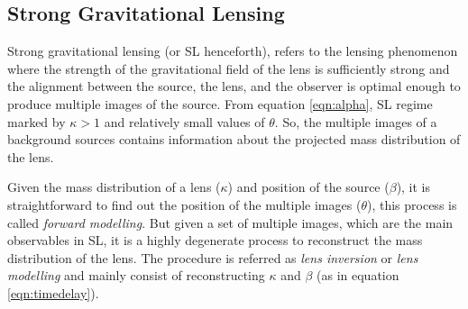 \subsection{Strong Gravitational Lensing}\label{sec:sl}

Strong gravitational lensing (or SL henceforth), refers to the lensing phenomenon
where the strength of the gravitational field of the lens is sufficiently strong and 
the alignment between the source, the lens, and the observer is optimal enough to
produce multiple images of the source. From equation \ref{eqn:alpha}, SL regime marked
by $\kappa >1$ and relatively small values of $\theta$. So, the multiple images of a
background sources contains information about the projected mass distribution of the lens. 

Given the mass distribution of a lens ($\kappa$) and position of the source ($\beta$),
it is straightforward to find out the position of the multiple images ($\theta$), this process
is called {\it forward modelling}. But given a set of multiple images, which are the main 
observables in SL, it is a highly degenerate process to reconstruct the mass
distribution of the lens. The procedure is referred as {\it lens inversion} or
{\it lens modelling} and mainly consist of reconstructing $\kappa$ and
$\beta$ (as in equation \ref{eqn:timedelay}). 

